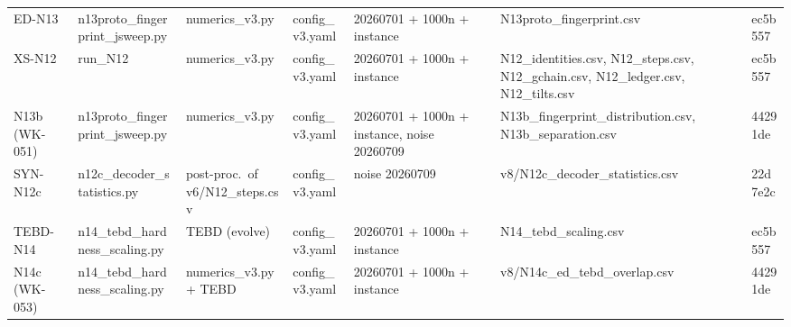 \begin{table}[tb]
\begin{ruledtabular}
\begin{tabular}{lllllll}
\parbox[t]{0.08\textwidth}{\raggedright ED-N13\strut} & \parbox[t]{0.15\textwidth}{\raggedright n13proto\_fingerprint\_jsweep.py\strut} & \parbox[t]{0.10\textwidth}{\raggedright numerics\_v3.py\strut} & \parbox[t]{0.09\textwidth}{\raggedright config\_v3.yaml\strut} & \parbox[t]{0.15\textwidth}{\raggedright 20260701 + 1000n + instance\strut} & \parbox[t]{0.20\textwidth}{\raggedright N13proto\_fingerprint.csv\strut} & ec5b557 \\[4pt]
\parbox[t]{0.08\textwidth}{\raggedright XS-N12\strut} & \parbox[t]{0.15\textwidth}{\raggedright run\_N12\strut} & \parbox[t]{0.10\textwidth}{\raggedright numerics\_v3.py\strut} & \parbox[t]{0.09\textwidth}{\raggedright config\_v3.yaml\strut} & \parbox[t]{0.15\textwidth}{\raggedright 20260701 + 1000n + instance\strut} & \parbox[t]{0.20\textwidth}{\raggedright N12\_identities.csv, N12\_steps.csv, N12\_gchain.csv, N12\_ledger.csv, N12\_tilts.csv\strut} & ec5b557 \\[4pt]
\parbox[t]{0.08\textwidth}{\raggedright N13b (WK-051)\strut} & \parbox[t]{0.15\textwidth}{\raggedright n13proto\_fingerprint\_jsweep.py\strut} & \parbox[t]{0.10\textwidth}{\raggedright numerics\_v3.py\strut} & \parbox[t]{0.09\textwidth}{\raggedright config\_v3.yaml\strut} & \parbox[t]{0.15\textwidth}{\raggedright 20260701 + 1000n + instance, noise 20260709\strut} & \parbox[t]{0.20\textwidth}{\raggedright N13b\_fingerprint\_distribution.csv, N13b\_separation.csv\strut} & 44291de \\[4pt]
\parbox[t]{0.08\textwidth}{\raggedright SYN-N12c\strut} & \parbox[t]{0.15\textwidth}{\raggedright n12c\_decoder\_statistics.py\strut} & \parbox[t]{0.10\textwidth}{\raggedright post-proc.\ of v6/N12\_steps.csv\strut} & \parbox[t]{0.09\textwidth}{\raggedright config\_v3.yaml\strut} & \parbox[t]{0.15\textwidth}{\raggedright noise 20260709\strut} & \parbox[t]{0.20\textwidth}{\raggedright v8/N12c\_decoder\_statistics.csv\strut} & 22d7e2c \\[4pt]
\parbox[t]{0.08\textwidth}{\raggedright TEBD-N14\strut} & \parbox[t]{0.15\textwidth}{\raggedright n14\_tebd\_hardness\_scaling.py\strut} & \parbox[t]{0.10\textwidth}{\raggedright TEBD (evolve)\strut} & \parbox[t]{0.09\textwidth}{\raggedright config\_v3.yaml\strut} & \parbox[t]{0.15\textwidth}{\raggedright 20260701 + 1000n + instance\strut} & \parbox[t]{0.20\textwidth}{\raggedright N14\_tebd\_scaling.csv\strut} & ec5b557 \\[4pt]
\parbox[t]{0.08\textwidth}{\raggedright N14c (WK-053)\strut} & \parbox[t]{0.15\textwidth}{\raggedright n14\_tebd\_hardness\_scaling.py\strut} & \parbox[t]{0.10\textwidth}{\raggedright numerics\_v3.py + TEBD\strut} & \parbox[t]{0.09\textwidth}{\raggedright config\_v3.yaml\strut} & \parbox[t]{0.15\textwidth}{\raggedright 20260701 + 1000n + instance\strut} & \parbox[t]{0.20\textwidth}{\raggedright v8/N14c\_ed\_tebd\_overlap.csv\strut} & 44291de \\[4pt]

\end{tabular}
\end{ruledtabular}
\end{table}
